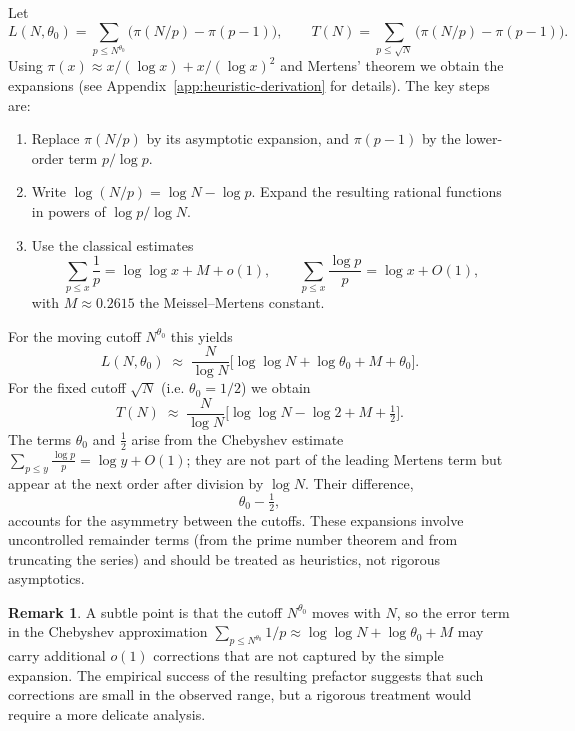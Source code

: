 \documentclass[11pt]{article}
\theoremstyle{definition}
\newtheorem{remark}{Remark}
\begin{document}
Let
\[
  L(N,\theta_0) = \sum_{p \le N^{\theta_0}} \bigl(\pi(N/p) - \pi(p-1)\bigr),
  \qquad
  T(N) = \sum_{p \le \sqrt{N}} \bigl(\pi(N/p) - \pi(p-1)\bigr).
\]
Using \(\pi(x) \approx x/(\log x) + x/(\log x)^2\) and Mertens' theorem we obtain the
expansions (see Appendix~\ref{app:heuristic-derivation} for details).  The key steps
are:
\begin{enumerate}
  \item Replace \(\pi(N/p)\) by its asymptotic expansion, and \(\pi(p-1)\) by the
        lower-order term \(p/\log p\).
  \item Write \(\log(N/p) = \log N - \log p\).  Expand the resulting rational
        functions in powers of \(\log p/\log N\).
  \item Use the classical estimates
        \[
        \sum_{p\le x}\frac{1}{p} = \log\log x + M + o(1),\qquad
        \sum_{p\le x}\frac{\log p}{p} = \log x + O(1),
        \]
        with \(M\approx 0.2615\) the Meissel–Mertens constant.
\end{enumerate}
For the moving cutoff \(N^{\theta_0}\) this yields
\[
 L(N,\theta_0) \;\approx\; \frac{N}{\log N}
 \bigl[\log\log N + \log\theta_0 + M + \theta_0\bigr].
\]
For the fixed cutoff \(\sqrt{N}\) (i.e. \(\theta_0=1/2\)) we obtain
\[
 T(N) \;\approx\; \frac{N}{\log N}
 \bigl[\log\log N - \log 2 + M + \tfrac{1}{2}\bigr].
\]
The terms \(\theta_0\) and \(\tfrac{1}{2}\) arise from the Chebyshev estimate
\(\sum_{p\le y}\frac{\log p}{p} = \log y + O(1)\); they are not part of the leading
Mertens term but appear at the next order after division by \(\log N\).  Their
difference,
\[
 \theta_0 - \tfrac{1}{2},
\]
accounts for the asymmetry between the cutoffs.  These expansions involve uncontrolled
remainder terms (from the prime number theorem and from truncating the series) and
should be treated as heuristics, not rigorous asymptotics.

\begin{remark}
A subtle point is that the cutoff \(N^{\theta_0}\) moves with \(N\), so the error
term in the Chebyshev approximation \(\sum_{p \leq N^{\theta_0}} 1/p \approx \log\log N + \log\theta_0 + M\) may carry additional \(o(1)\) corrections that are not captured by the simple expansion.  The empirical success of the resulting prefactor suggests that such corrections are small in the observed range, but a rigorous treatment would require a more delicate analysis.
\end{remark}
\end{document}
